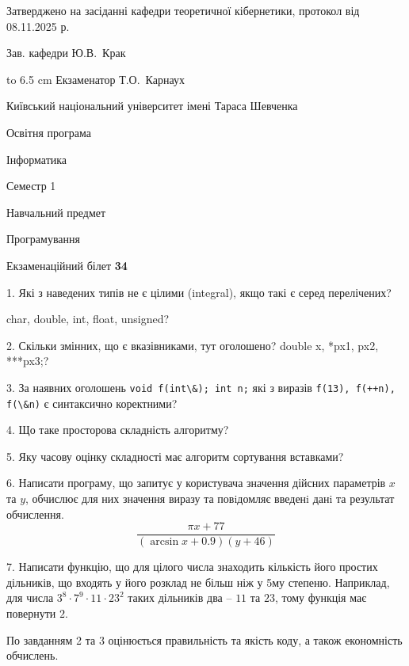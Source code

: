\documentclass[12pt, ukrainian]{article}
\def\code#1{\Verb!#1!}
\begin{document}
{\smallskip\smallskip \begin {scriptsize} Затверджено на засіданні кафедри теоретичної кібернетики, протокол   від   08.11.2025 р.\par\smallskip\smallskip\smallskip\smallskip
{\parbox {6.5 cm} {Зав. кафедри \dotfill Ю.В.~Крак}}\hspace {0.7cm} {\hbox to 6.5 cm { Екзаменатор \dotfill Т.О.~Карнаух}} \end{scriptsize}}
\vspace{0.9cm}
{{\begin {scriptsize}\par
{ \center  Київський національний університет імені Тараса Шевченка \par}
{\parbox {5 cm}{Освітня програма \hfill}{\parbox {7 cm}{Інформатика\hfill}}\parbox {6 cm}{\hfill Семестр 1}}\par
{\parbox {5 cm} {Навчальний предмет \hfill}\parbox {7 cm}{Програмування \hfill}\parbox {6cm}{\hfill}\par}\vspace{-15pt} \end{scriptsize}}{\center Екзаменаційний білет \No \textbf { 34 }\par}}
{%
1. Які з наведених типів не є цілими (integral), якщо такі є серед перелічених?

char, double, int, float, unsigned?
\par
\vspace{2mm}
2. Скільки змінних, що є вказівниками, тут оголошено?
double x, *px1, px2, ***px3;?
\par
\vspace{2mm}
3. За наявних оголошень \code{void f(int\&); int n;} які з виразів \code{f(13), f(++n), f(\&n)} є синтаксично коректними?
\par
\vspace{2mm}
4. Що таке просторова складність алгоритму?
\par
\vspace{2mm}
5. Яку часову оцінку складності має алгоритм сортування вставками?
\par
\vspace{2mm}
6. Написати програму, що запитує у користувача значення дійсних параметрів $x$ та $y$, обчислює для них значення виразу та повiдомляє введенi данi та результат обчислення.
$$\frac{\pi x + 77}{(\arcsin x + 0.9) (y + 46)}$$ 

\par
7. Написати функцію, що для цілого числа знаходить кількість його простих дільників, що входять у його розклад не більш ніж у 5му степеню. Наприклад, для числа $3^8{\cdot}7^9{\cdot}11{\cdot}23^{2}$ таких дільників два – $11$ та $23$, тому функція має повернути $2$.

По завданням 2 та 3 оцінюється правильність та якість коду, а також економність обчислень.

}
\end{document}

